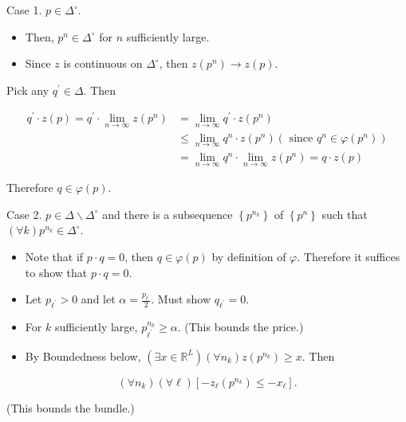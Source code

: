 \documentclass[10pt]{article}
\begin{document}
Case 1. $p \in \Delta^{\circ}$.

\begin{itemize}
  \item Then, $p^{n} \in \Delta^{\circ}$ for $n$ sufficiently large.
  \item Since $z$ is continuous on $\Delta^{\circ}$, then $z\left(p^{n}\right) \rightarrow z(p)$.
\end{itemize}

Pick any $q^{\prime} \in \Delta$. Then

$$
\begin{aligned}
q^{\prime} \cdot z(p)=q^{\prime} \cdot \lim _{n \rightarrow \infty} z\left(p^{n}\right) & =\lim _{n \rightarrow \infty} q^{\prime} \cdot z\left(p^{n}\right) \\
& \leq \lim _{n \rightarrow \infty} q^{n} \cdot z\left(p^{n}\right)\left(\text { since } q^{n} \in \varphi\left(p^{n}\right)\right) \\
& =\lim _{n \rightarrow \infty} q^{n} \cdot \lim _{n \rightarrow \infty} z\left(p^{n}\right)=q \cdot z(p)
\end{aligned}
$$

Therefore $q \in \varphi(p)$.

Case 2. $p \in \Delta \backslash \Delta^{\circ}$ and there is a subsequence $\left\{p^{n_{k}}\right\}$ of $\left\{p^{n}\right\}$ such that $(\forall k) p^{n_{k}} \in \Delta^{\circ}$.

\begin{itemize}
  \item Note that if $p \cdot q=0$, then $q \in \varphi(p)$ by definition of $\varphi$. Therefore it suffices to show that $p \cdot q=0$.
  \item Let $p_{\ell^{\prime}}>0$ and let $\alpha=\frac{p_{\ell^{\prime}}}{2}$. Must show $q_{\ell^{\prime}}=0$.
  \item For $k$ sufficiently large, $p_{\ell^{\prime}}^{n_{k}} \geq \alpha$. (This bounds the price.)
  \item By Boundedness below, $\left(\exists x \in \mathbb{R}^{L}\right)\left(\forall n_{k}\right) z\left(p^{n_{k}}\right) \geq x$. Then
\end{itemize}


\begin{equation*}
\left(\forall n_{k}\right)(\forall \ell)\left[-z_{\ell}\left(p^{n_{k}}\right) \leq-x_{\ell}\right] . \tag{1}
\end{equation*}


(This bounds the bundle.)
\end{document}
